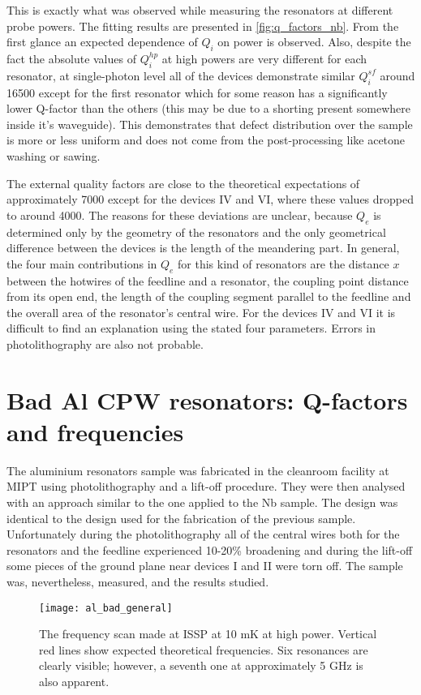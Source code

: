 \documentclass[12pt]{article}
\numberwithin{equation}{section}
\begin{document}
This is exactly what was observed while measuring the resonators at different probe powers. The fitting results are presented in \autoref{fig:q_factors_nb}. From the first glance an expected dependence of $Q_i$ on power is observed. Also, despite the fact the absolute values of $Q_i^{hp}$ at high powers are very different for each resonator, at single-photon level all of the devices demonstrate similar $Q_i^{sf}$ around 16500 except for the first resonator which for some reason has a significantly lower Q-factor than the others (this may be due to a shorting present somewhere inside it's waveguide). This demonstrates that defect distribution over the sample is more or less uniform and does not come from the post-processing like acetone washing or sawing.

The external quality factors are close to the theoretical expectations of approximately 7000 except for the devices IV and VI, where these values dropped to around 4000. The reasons for these deviations are unclear, because $Q_e$ is determined only by the geometry of the resonators and the only geometrical difference between the devices is the length of the meandering part. In general, the four main contributions in $Q_e$ for this kind of resonators are the distance $x$ between the hotwires of the feedline and a resonator, the coupling point distance from its open end, the length of the coupling segment parallel to the feedline and the overall area of the resonator's central wire. For the devices IV and VI it is difficult to find an explanation using the stated four parameters. Errors in photolithography are also not probable.

\section{Bad Al CPW resonators: Q-factors and frequencies}

The aluminium resonators sample was fabricated in the cleanroom facility at MIPT using photolithography and a lift-off procedure. They were then analysed with an approach similar to the one applied to the Nb sample. The design was identical to the design used for the fabrication of the previous sample. Unfortunately during the photolithography all of the central wires both for the resonators and the feedline experienced 10-20\% broadening and during the lift-off some pieces of the ground plane near devices I and II were torn off. The sample was, nevertheless, measured, and the results studied.

\begin{figure}[h]
\centering
\texttt{[image: al\_bad\_general]}
\caption{The frequency scan made at ISSP at 10 mK at high power. Vertical red lines show expected theoretical frequencies. Six resonances are clearly visible; however, a seventh one at approximately 5 GHz is also apparent.}
\label{fig:al_general}
\end{figure}
\end{document}
